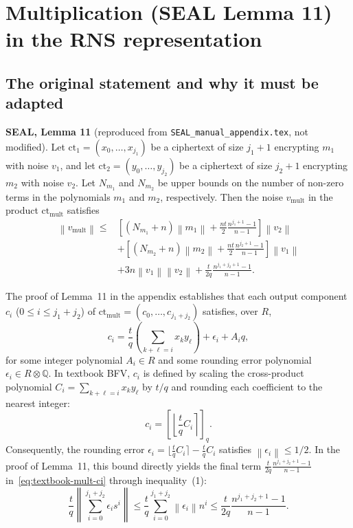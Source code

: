 \documentclass[11pt]{article}
\newcommand{\norm}[1]{\left\lVert #1\right\rVert}
\newcommand{\ct}{\mathrm{ct}}
\newcommand{\ctmult}{\mathrm{ct}_{\mathrm{mult}}}
\newcommand{\vmult}{v_{\mathrm{mult}}}
\newcommand{\Sgeo}[1]{\frac{n^{#1+1}-1}{n-1}}            %
\theoremstyle{plain}
\theoremstyle{definition}
\theoremstyle{remark}
\begin{document}
\section{Multiplication (SEAL Lemma 11) in the RNS representation}
\label{sec:mult}

\subsection{The original statement and why it must be adapted}

\textbf{SEAL, Lemma 11} (reproduced from \texttt{SEAL\_manual\_appendix.tex}, not modified).
Let $\ct_1=(x_0,\ldots,x_{j_1})$ be a ciphertext of size $j_1+1$
encrypting $m_1$ with noise $v_1$, and let
$\ct_2=(y_0,\ldots,y_{j_2})$ be a ciphertext of size $j_2+1$
encrypting $m_2$ with noise $v_2$. Let $N_{m_1}$ and $N_{m_2}$
be upper bounds on the number of non-zero terms in the polynomials
$m_1$ and $m_2$, respectively. Then the noise $\vmult$ in the product
$\ctmult$ satisfies
\begin{align*}
\norm{\vmult}\leq{}&
\left[
 (N_{m_1}+n)\norm{m_1}
 +\frac{nt}{2}\Sgeo{j_1}
\right]\norm{v_2}\\
&+\left[
 (N_{m_2}+n)\norm{m_2}
 +\frac{nt}{2}\Sgeo{j_2}
\right]\norm{v_1}\\
&+3n\norm{v_1}\norm{v_2}
 +\frac{t}{2q}\Sgeo{j_1+j_2}.
\end{align*}

The proof of Lemma~11 in the appendix establishes that each output component
$c_i$ ($0\leq i\leq j_1+j_2$) of $\ctmult=(c_0,\dots,c_{j_1+j_2})$ satisfies, over $R$,
\begin{equation}
 c_i = \frac{t}{q}\left(\sum_{k+\ell=i}x_ky_\ell\right) + \epsilon_i + A_iq ,
 \label{eq:textbook-mult-ci}
\end{equation}
for some integer polynomial $A_i\in R$ and some rounding error polynomial $\epsilon_i\in R\otimes\mathbb{Q}$.
In textbook BFV, $c_i$ is defined by scaling the cross-product polynomial $C_i = \sum_{k+\ell=i}x_ky_\ell$
by $t/q$ and rounding each coefficient to the nearest integer:
\[
 c_i = \left[\left\lfloor \frac{t}{q}C_i\right\rceil\right]_q .
\]
Consequently, the rounding error $\epsilon_i = \lfloor \frac{t}{q}C_i\rceil - \frac{t}{q}C_i$ satisfies
$\norm{\epsilon_i}\leq 1/2$. In the proof of Lemma~11, this bound directly yields the final term
$\frac{t}{2q}\Sgeo{j_1+j_2}$ in~\eqref{eq:textbook-mult-ci} through inequality~(1):
\[
 \frac{t}{q}\left\lVert\sum_{i=0}^{j_1+j_2}\epsilon_is^i\right\rVert
 \leq \frac{t}{q}\sum_{i=0}^{j_1+j_2}\norm{\epsilon_i}n^i
 \leq \frac{t}{2q}\Sgeo{j_1+j_2}.
\]
\end{document}
